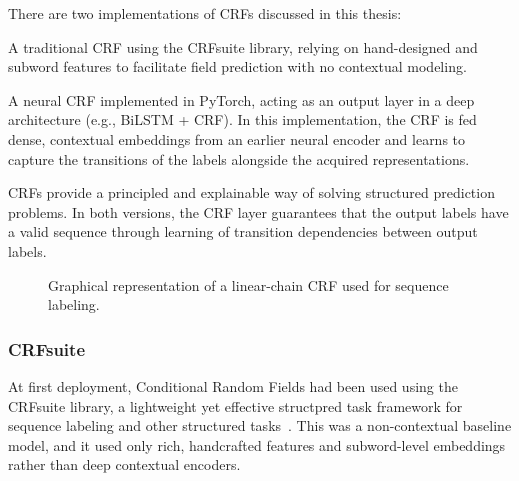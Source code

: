 There are two implementations of CRFs discussed in this thesis:
\begin{compactitem}
\item A traditional CRF using the CRFsuite library, relying on hand-designed and subword features to facilitate field prediction with no contextual modeling.
\item A neural CRF implemented in PyTorch, acting as an output layer in a deep architecture (e.g., BiLSTM + CRF). In this implementation, the CRF is fed dense, contextual embeddings from an earlier neural encoder and learns to capture the transitions of the labels alongside the acquired representations.
\end{compactitem}
CRFs provide a principled and explainable way of solving structured prediction problems. In both versions, the CRF layer guarantees that the output labels have a valid sequence through learning of transition dependencies between output labels.
\begin{figure}[ht]
    \centering
    
    \caption{Graphical representation of a linear-chain CRF used for sequence labeling.}
    \label{fig:crf-chain}
\end{figure}

\subsubsection{CRFsuite}
At first deployment, Conditional Random Fields had been used using the CRFsuite library, a lightweight yet effective structpred task framework for sequence labeling and other structured tasks~\cite{pythoncrfsuite}. This was a non-contextual baseline model, and it used only rich, handcrafted features and subword-level embeddings rather than deep contextual encoders.

